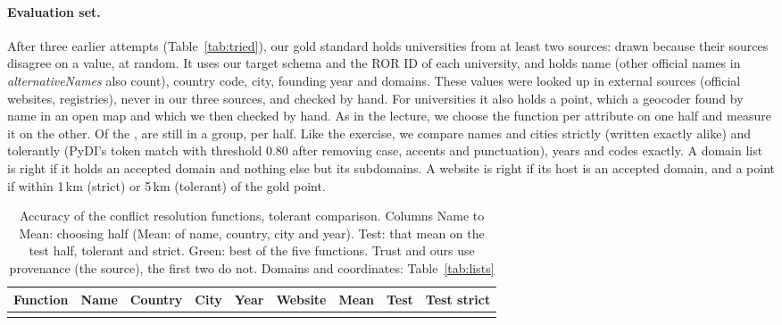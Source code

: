 \documentclass[runningheads,a4paper]{llncs}
\begin{document}
\paragraph{Evaluation set.} After three earlier attempts (Table~\ref{tab:tried}), our gold standard holds
\goldTotal{} universities from at least two sources: \goldConflict{} drawn because their sources disagree
on a value, \goldRandom{} at random. It uses our target schema and the ROR ID of each university, and holds
name (other official names in \emph{alternativeNames} also count), country code, city, founding year and
domains. These values were looked up in external sources (official websites, registries),
never in our three sources, and checked by hand. For \coordGold{} universities it also holds a point,
which a geocoder found by name in an open map and which we then checked by hand.
As in the lecture, we choose the function per attribute on one half and measure it on the other. Of the
\goldTotal{}, \goldEvaluated{} are still in a group, \goldUsed{} per half. Like the exercise, we compare names and cities strictly
(written exactly alike) and tolerantly (PyDI's token match with threshold 0.80 after removing case, accents
and punctuation), years and codes exactly. A domain list is right if it holds an accepted domain and
nothing else but its subdomains. A website is right if its host is an accepted domain, and a point if
within 1\,km (strict) or 5\,km (tolerant) of the gold point.

\begin{table}[H]
\caption{Accuracy of the conflict resolution functions, tolerant comparison. Columns Name to Mean:
choosing half (Mean: of name, country, city and year). Test: that mean on the test half, tolerant and strict.
Green: best of the five functions. Trust and ours use provenance (the source), the first two do not.
Domains and coordinates: Table~\ref{tab:lists}}\label{tab:fusion}
\scriptsize
\setlength{\tabcolsep}{4pt}
\begin{tabularx}{\textwidth}{@{}Lrrrrrrrr@{}}
\toprule
Function & Name & Country & City & Year & Website & Mean & Test & Test strict\\
\midrule
{}
\bottomrule
\end{tabularx}
\end{table}
\end{document}
